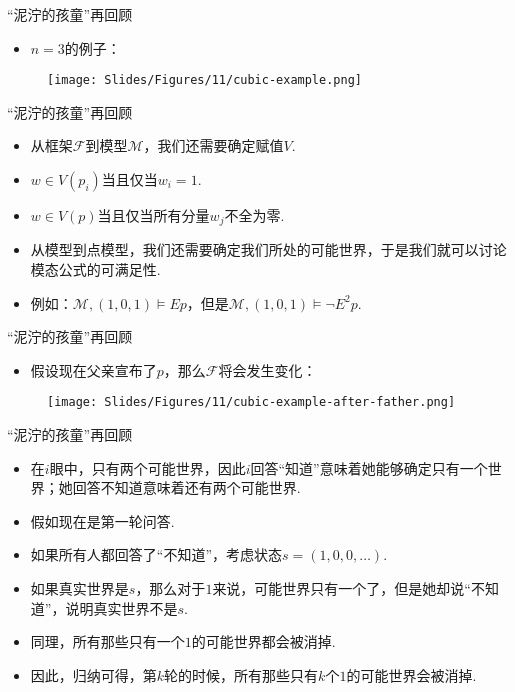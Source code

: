 \begin{frame}{“泥泞的孩童”再回顾}
\begin{itemize}
    \item $n=3$的例子：
\end{itemize}
\begin{figure}
    \centering
    \texttt{[image: Slides/Figures/11/cubic-example.png]}
\end{figure}
\end{frame}

\begin{frame}{“泥泞的孩童”再回顾}
\begin{itemize}
    \item 从框架$\mathcal F$到模型$\mathcal M$，我们还需要确定赋值$V$.
    \item $w\in V(p_i)$当且仅当$w_i=1$.
    \item $w\in V(p)$当且仅当所有分量$w_j$不全为零.
    \item 从模型到点模型，我们还需要确定我们所处的可能世界，于是我们就可以讨论模态公式的可满足性.
    \item 例如：$\mathcal M,(1,0,1)\vDash Ep$，但是$\mathcal M,(1,0,1)\vDash \neg E^2p$.
\end{itemize}
\end{frame}

\begin{frame}{“泥泞的孩童”再回顾}
\begin{itemize}
    \item 假设现在父亲宣布了$p$，那么$\mathcal F$将会发生变化：
\end{itemize}
\begin{figure}[ht]
    \centering
    \texttt{[image: Slides/Figures/11/cubic-example-after-father.png]}
\end{figure}
\end{frame}

\begin{frame}{“泥泞的孩童”再回顾}
\begin{itemize}
    \item 在$i$眼中，只有两个可能世界，因此$i$回答“知道”意味着她能够确定只有一个世界；她回答不知道意味着还有两个可能世界.
    \item 假如现在是第一轮问答.
    \item 如果所有人都回答了“不知道”，考虑状态$s=(1,0,0,\dots)$.
    \item 如果真实世界是$s$，那么对于$1$来说，可能世界只有一个了，但是她却说“不知道”，说明真实世界不是$s$.
    \item 同理，所有那些只有一个$1$的可能世界都会被消掉.
    \item 因此，归纳可得，第$k$轮的时候，所有那些只有$k$个$1$的可能世界会被消掉. %
\end{itemize}
\end{frame}

